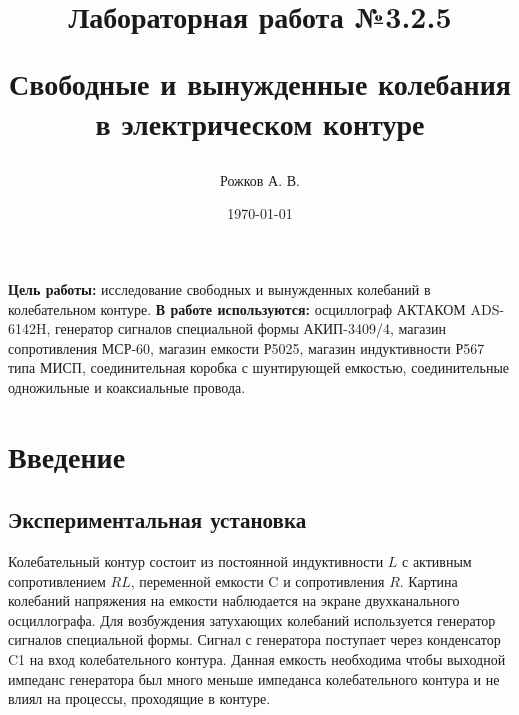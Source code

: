 \documentclass[a4paper, 12pt]{article}
\title{\begin{center}Лабораторная работа №3.2.5\end{center}
Свободные и вынужденные колебания в электрическом контуре}
\author{Рожков А. В.}
\date{\today}
\begin{document}
    \maketitle
    \newpage
    \renewcommand*{\thesubsection}{\thesection.\Alph{subsection}}

    \textbf{Цель работы:} исследование свободных и вынужденных колебаний в колебательном контуре.
    \textbf{В работе используются:} осциллограф АКТАКОМ ADS-6142H, генератор сигналов специальной формы АКИП-3409/4, магазин сопротивления МСР-60, магазин емкости Р5025, магазин индуктивности Р567 типа МИСП, соединительная коробка с шунтирующей емкостью, соединительные одножильные и коаксиальные провода.

    \section{Введение}
        \subsection*{Экспериментальная установка}
            Колебательный контур состоит из постоянной индуктивности $L$ с активным сопротивлением $RL$, переменной емкости C и сопротивления $R$. Картина колебаний напряжения на емкости наблюдается на экране двухканального осциллографа. Для возбуждения затухающих колебаний используется генератор сигналов специальной формы. Сигнал с генератора поступает через конденсатор C1 на вход колебательного контура. Данная емкость необходима чтобы выходной импеданс генератора был много меньше импеданса колебательного контура и не влиял на процессы, проходящие в контуре.
\end{document}
